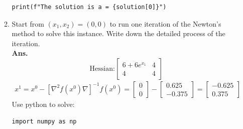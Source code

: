 \documentclass[12pt]{article}
\begin{document}
\begin{enumerate}
\begin{enumerate}
\begin{lstlisting}
print(f"The solution is a = {solution[0]}")
                        \end{lstlisting}
                  \item Start from $(x_1, x_2) = (0, 0)$ to run one iteration of the Newton's method to solve this instance. Write down the detailed process of the iteration.\\
                        \textbf{Ans.}
                        \begin{equation*}
                              \text{Hessian:}
                              \begin{bmatrix}
                                    6+6e^{x_1} & 4 \\
                                    4          & 4
                              \end{bmatrix}
                        \end{equation*}
                        \begin{align*}
                              x^1 = x^0 - [\nabla^{2}f(x^0)\nabla]^{-1} f(x^0) = \begin{bmatrix}
                                                                                       0 \\
                                                                                       0
                                                                                 \end{bmatrix} - \begin{bmatrix}
                                                                                                       0.625 \\
                                                                                                       -0.375
                                                                                                 \end{bmatrix} = \begin{bmatrix}
                                                                                                                       -0.625 \\
                                                                                                                       0.375
                                                                                                                 \end{bmatrix}
                        \end{align*}
                        Use python to solve:
                        \begin{lstlisting}
import numpy as np


\end{lstlisting}
\end{enumerate}
\end{enumerate}
\end{document}
